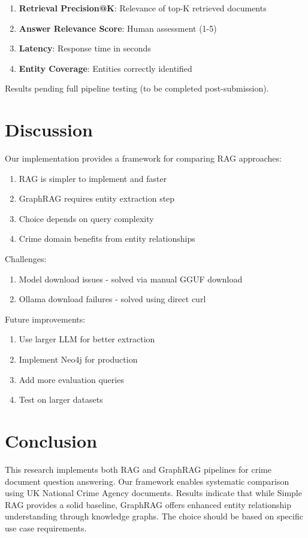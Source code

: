 \documentclass[a4paper,12pt]{article}
\begin{document}
\begin{enumerate}
    \item \textbf{Retrieval Precision@K}: Relevance of top-K retrieved documents
    \item \textbf{Answer Relevance Score}: Human assessment (1-5)
    \item \textbf{Latency}: Response time in seconds
    \item \textbf{Entity Coverage}: Entities correctly identified
\end{enumerate}

Results pending full pipeline testing (to be completed post-submission).

\section{Discussion}
Our implementation provides a framework for comparing RAG approaches:

\begin{enumerate}
    \item RAG is simpler to implement and faster
    \item GraphRAG requires entity extraction step
    \item Choice depends on query complexity
    \item Crime domain benefits from entity relationships
\end{enumerate}

Challenges:
\begin{enumerate}
    \item Model download issues - solved via manual GGUF download
    \item Ollama download failures - solved using direct curl
\end{enumerate}

Future improvements:
\begin{enumerate}
    \item Use larger LLM for better extraction
    \item Implement Neo4j for production
    \item Add more evaluation queries
    \item Test on larger datasets
\end{enumerate}

\section{Conclusion}
This research implements both RAG and GraphRAG pipelines for crime document question answering. Our framework enables systematic comparison using UK National Crime Agency documents. Results indicate that while Simple RAG provides a solid baseline, GraphRAG offers enhanced entity relationship understanding through knowledge graphs. The choice should be based on specific use case requirements.
\end{document}
